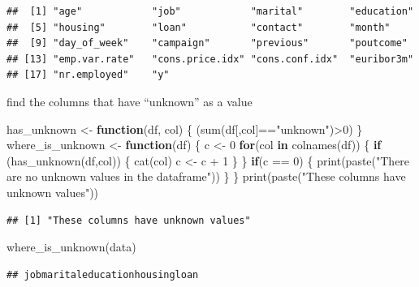 \documentclass[
]{article}
\newenvironment{Shaded}{\begin{snugshade}}{\end{snugshade}}
\newcommand{\ControlFlowTok}[1]{\textcolor[rgb]{0.13,0.29,0.53}{\textbf{#1}}}
\newcommand{\DecValTok}[1]{\textcolor[rgb]{0.00,0.00,0.81}{#1}}
\newcommand{\FunctionTok}[1]{\textcolor[rgb]{0.00,0.00,0.00}{#1}}
\newcommand{\NormalTok}[1]{#1}
\newcommand{\OtherTok}[1]{\textcolor[rgb]{0.56,0.35,0.01}{#1}}
\newcommand{\SpecialCharTok}[1]{\textcolor[rgb]{0.00,0.00,0.00}{#1}}
\newcommand{\StringTok}[1]{\textcolor[rgb]{0.31,0.60,0.02}{#1}}
\begin{document}
\begin{verbatim}
##  [1] "age"            "job"            "marital"        "education"     
##  [5] "housing"        "loan"           "contact"        "month"         
##  [9] "day_of_week"    "campaign"       "previous"       "poutcome"      
## [13] "emp.var.rate"   "cons.price.idx" "cons.conf.idx"  "euribor3m"     
## [17] "nr.employed"    "y"
\end{verbatim}

find the columns that have ``unknown'' as a value

\begin{Shaded}
\begin{Highlighting}[]
\NormalTok{has\_unknown }\OtherTok{\textless{}{-}} \ControlFlowTok{function}\NormalTok{(df, col) \{}
\NormalTok{  (}\FunctionTok{sum}\NormalTok{(df[,col]}\SpecialCharTok{==}\StringTok{"unknown"}\NormalTok{)}\SpecialCharTok{\textgreater{}}\DecValTok{0}\NormalTok{)}
\NormalTok{\}}
\NormalTok{where\_is\_unknown }\OtherTok{\textless{}{-}} \ControlFlowTok{function}\NormalTok{(df) \{}
\NormalTok{  c }\OtherTok{\textless{}{-}} \DecValTok{0}
  \ControlFlowTok{for}\NormalTok{(col }\ControlFlowTok{in} \FunctionTok{colnames}\NormalTok{(df)) \{}
    \ControlFlowTok{if}\NormalTok{ (}\FunctionTok{has\_unknown}\NormalTok{(df,col)) \{}
      \FunctionTok{cat}\NormalTok{(col)}
\NormalTok{      c }\OtherTok{\textless{}{-}}\NormalTok{ c }\SpecialCharTok{+} \DecValTok{1}
\NormalTok{    \}}
\NormalTok{  \}}
  \ControlFlowTok{if}\NormalTok{(c }\SpecialCharTok{==} \DecValTok{0}\NormalTok{) \{}
    \FunctionTok{print}\NormalTok{(}\FunctionTok{paste}\NormalTok{(}\StringTok{"There are no unknown values in the dataframe"}\NormalTok{))}
\NormalTok{  \}}
\NormalTok{\}}
\FunctionTok{print}\NormalTok{(}\FunctionTok{paste}\NormalTok{(}\StringTok{"These columns have unknown values"}\NormalTok{))}
\end{Highlighting}
\end{Shaded}

\begin{verbatim}
## [1] "These columns have unknown values"
\end{verbatim}

\begin{Shaded}
\begin{Highlighting}[]
\FunctionTok{where\_is\_unknown}\NormalTok{(data)}
\end{Highlighting}
\end{Shaded}

\begin{verbatim}
## jobmaritaleducationhousingloan
\end{verbatim}
\end{document}
